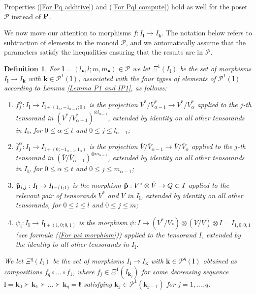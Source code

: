 \documentclass[12pt]{article}
\def\mc {\mathcal}
\def\mk {\mathfrak}
\newtheorem{definition}{Definition}[section]
\begin{document}
Properties (\ref{For Pq additive}) and (\ref{For Pql compute}) hold as well for the poset $\mc P$ instead of ${\bf P}$.


We now move our attention to morphisms $f:I_{\bm l}\to I_{\bm k}$. The notation below refers to subtraction of elements in the monoid $\mc P$, and we automatically assume that the parameters satisfy the inequalities ensuring that the results are in $\mc P$.

\begin{definition}\label{Def Xibml}
For $\bm l=(l_\bullet,l;m,m_\bullet)\in\mc P$ we let $\Xi^1(I_{\bm l})$ be the set of morphisms $I_{\bm l}\to I_{\bm k}$ with $\bm k\in\mc P^{1}(\bm l)$, associated with the four types of elements of $\mc P^{1}(\bm l)$ according to Lemma \ref{Lemma P1 and IP1}, as follows:
\begin{enumerate}
\item[{\rm (i)}] $f^{\alpha}_{j}:I_{\bm l}\to I_{\bm l+(1_\alpha,-1_{\alpha-1};0)}$ is the projection $V^*/V^*_{\alpha-1}\to V^*/V^*_{\alpha}$ applied to the $j$-th tensorand in $(V^*/V^*_{\alpha-1})^{\otimes l_{\alpha-1}}$, extended by identity on all other tensorands in $I_{\bm l}$, for $0\leq\alpha\leq t$ and $0\leq j\leq l_{\alpha-1}$;
\item[{\rm (ii)}] $\bar f^{\alpha}_{j}:I_{\bm l}\to I_{\bm l +(0;-1_{\alpha-1},1_{\alpha})}$ is the projection $\bar V/\bar V_{\alpha-1}\to \bar V/\bar V_{\alpha}$ applied to the $j$-th tensorand in $(\bar V/\bar V_{\alpha-1})^{\otimes m_{\alpha-1}}$, extended by identity on all other tensorands in $I_{\bm l}$, for $0\leq\alpha\leq t$ and $0\leq j\leq m_{\alpha-1}$; 
\item[{\rm (iii)}] $\tilde{\bf p}_{i,j}:I_{\bm l}\to I_{\bm l-(1;1)}$ is the morphism $\tilde{\bf p}:V^*\otimes\bar V \to Q \subset I$ applied to the relevant pair of tensorands $V^*$ and $\bar V$ in $I_{\bm l}$, extended by identity on all other tensorands, for $0\leq i\leq l$ and $0\leq j\leq m$;
\item[{\rm (iv)}] $\psi_{\bm l}:I_{\bm l}\to I_{\bm l+(1,0;0,1)}$ is the morphism $\psi:I \to (V^*/V_*)\otimes(\bar V/V)\otimes I=I_{1,0;0,1}$ (see formula (\ref{For psi morphism})) applied to the tensorand $I$, extended by the identity to all other tensorands in $I_{\bm l}$.
\end{enumerate}
We let $\Xi^q(I_{\bm l})$ be the set of morphisms $I_{\bm l}\to I_{\bm k}$ with $\bm k\in\mc P^{q}(\bm l)$ obtained as compositions $f_q\circ...\circ f_1$, where $f_j\in\Xi^1(I_{\bm k_j})$ for some decreasing sequence $\bm l=\bm k_0\succ\bm k_1\succ...\succ\bm k_q=\mk k$ satisfying $\bm k_j\in\mc P^1(\bm k_{j-1})$ for $j=1,...,q$.
\end{definition}
\end{document}
